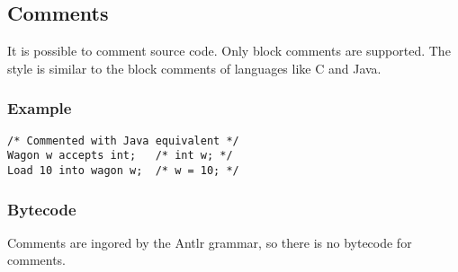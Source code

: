 \subsection{Comments}

It is possible to comment source code. Only block comments are supported. The style is similar to the block comments of languages like C and Java.

\subsubsection*{Example}

\begin{lstlisting}
/* Commented with Java equivalent */
Wagon w accepts int;   /* int w; */
Load 10 into wagon w;  /* w = 10; */
\end{lstlisting}

\subsubsection*{Bytecode}

Comments are ingored by the Antlr grammar, so there is no bytecode for comments.
